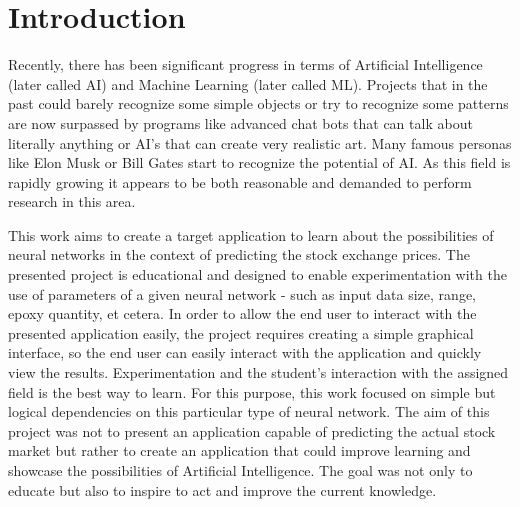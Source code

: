 \chapter{Introduction}

    Recently, there has been significant progress in terms of Artificial Intelligence (later called AI) and Machine Learning (later called ML). Projects that in the past could barely recognize some simple objects or try to recognize some patterns are now surpassed by programs like advanced chat bots that can talk about literally anything or AI’s that can create very realistic art. Many famous personas like Elon Musk or Bill Gates start to recognize the potential of AI. 
    As this field is rapidly growing it appears to be both reasonable and demanded to perform research in this area.
    \par 
    This work aims to create a target application to learn about the possibilities of neural networks in the context of predicting the stock exchange prices. The presented project is educational and designed to enable experimentation with the use of parameters of a given neural network - such as input data size, range, epoxy quantity, et cetera. In order to allow the end user to interact with the presented application easily, the project requires creating a simple graphical interface, so the end user can easily interact with the application and quickly view the results. Experimentation and the student's interaction with the assigned field is the best way to learn. For this purpose, this work focused on simple but logical dependencies on this particular type of neural network. The aim of this project was not to present an application capable of predicting the actual stock market but rather to create an application that could improve learning and showcase the possibilities of Artificial Intelligence. The goal was not only to educate but also to inspire to act and improve the current knowledge.